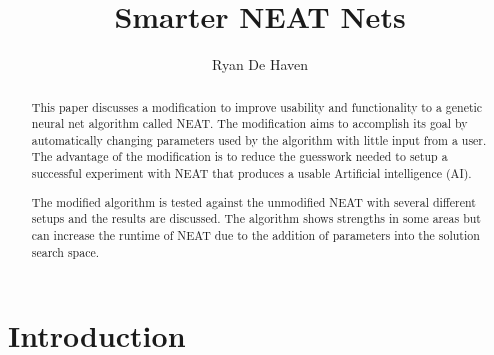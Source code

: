 \documentclass[12pt]{ucthesis} \newif\ifpdf \ifx\pdfoutput\undefined
\begin{document}
\title{Smarter NEAT Nets}

\author{Ryan De Haven}
  
 
 \chair{} \othermemberA{} \othermemberB{}   


\maketitle

\begin{frontmatter}

\copyrightpage

\approvalpage

 
\begin{abstract}
This paper discusses a modification to improve usability and functionality to a
genetic neural net algorithm called NEAT. The modification aims to accomplish
its goal by automatically changing parameters used by the algorithm with little
input from a user. The advantage of the modification is to reduce the guesswork
needed to setup a successful experiment with NEAT that produces a usable
Artificial intelligence (AI).

The modified algorithm is tested against the unmodified NEAT with several
different setups and the results are discussed. The algorithm shows strengths in
some areas but can increase the runtime of NEAT due to the addition of parameters into the
solution search space.

\end{abstract}

\begin{acknowledgements}

\end{acknowledgements}

\tableofcontents

\listoftables

\listoffigures

\end{frontmatter}

\pagestyle{plain}

\renewcommand{\baselinestretch}{1.66}


\chapter{Introduction}
\end{document}
